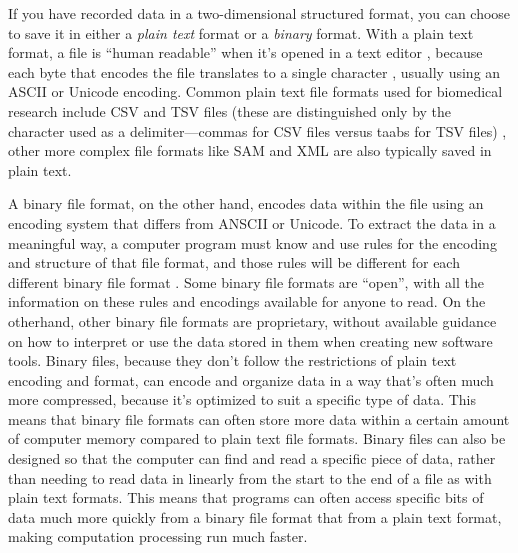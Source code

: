 \documentclass[]{tufte-book}
\begin{document}
If you have recorded data in a two-dimensional structured format, you can choose
to save it in either a \emph{plain text} format or a \emph{binary} format. With a plain
text format, a file is ``human readable'' when it's opened in a text editor
\citep{hunt2000pragmatic, janssens2014data}, because each byte that encodes the file
translates to a single character \citep{murrell2009introduction}, usually using an
ASCII or Unicode encoding. Common plain text file formats used for biomedical
research include CSV and TSV files (these are distinguished only by the
character used as a delimiter---commas for CSV files versus taabs for TSV files)
\citep{buffalo2015bioinformatics}, other more complex file formats like SAM and XML
are also typically saved in plain text.

A binary file format, on the other hand, encodes data within the file using an
encoding system that differs from ANSCII or Unicode. To extract the data in a
meaningful way, a computer program must know and use rules for the encoding and
structure of that file format, and those rules will be different for each
different binary file format \citep{murrell2009introduction}. Some binary file
formats are ``open'', with all the information on these rules and encodings
available for anyone to read. On the otherhand, other binary file formats are
proprietary, without available guidance on how to interpret or use the data
stored in them when creating new software tools. Binary files, because they
don't follow the restrictions of plain text encoding and format, can encode and
organize data in a way that's often much more compressed, because it's optimized
to suit a specific type of data. This means that binary file formats can often
store more data within a certain amount of computer memory compared to plain
text file formats. Binary files can also be designed so that the computer can
find and read a specific piece of data, rather than needing to read data in
linearly from the start to the end of a file as with plain text formats. This
means that programs can often access specific bits of data much more quickly
from a binary file format that from a plain text format, making computation
processing run much faster.
\end{document}
